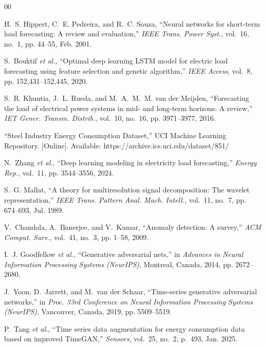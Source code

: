 \documentclass[conference]{IEEEtran}
\begin{document}
\begin{thebibliography}{00}

H.~S. Hippert, C.~E. Pedreira, and R.~C. Souza, ``Neural networks 
for short-term load forecasting: A review and evaluation,'' 
\emph{IEEE Trans. Power Syst.}, vol.~16, no.~1, pp. 44--55, 
Feb. 2001.

S.~Bouktif \emph{et al.}, ``Optimal deep learning LSTM model for 
electric load forecasting using feature selection and genetic 
algorithm,'' \emph{IEEE Access}, vol.~8, pp. 152,431--152,445, 2020.

S.~R. Khuntia, J.~L. Rueda, and M.~A.~M.~M. van der Meijden, 
``Forecasting the load of electrical power systems in mid- and 
long-term horizons: A review,'' \emph{IET Gener. Transm. Distrib.}, 
vol.~10, no.~16, pp. 3971--3977, 2016.

``Steel Industry Energy Consumption Dataset,'' UCI Machine 
Learning Repository. [Online]. Available: 
https://archive.ics.uci.edu/dataset/851/

N.~Zhang \emph{et al.}, ``Deep learning modeling in electricity 
load forecasting,'' \emph{Energy Rep.}, vol.~11, pp. 3544--3556, 
2024.

S.~G. Mallat, ``A theory for multiresolution signal decomposition: 
The wavelet representation,'' \emph{IEEE Trans. Pattern Anal. 
Mach. Intell.}, vol.~11, no.~7, pp. 674--693, Jul. 1989.

V.~Chandola, A.~Banerjee, and V.~Kumar, ``Anomaly detection: 
A survey,'' \emph{ACM Comput. Surv.}, vol.~41, no.~3, pp. 1--58, 
2009.

I.~J. Goodfellow \emph{et al.}, ``Generative adversarial nets,'' 
in \emph{Advances in Neural Information Processing Systems 
(NeurIPS)}, Montreal, Canada, 2014, pp. 2672--2680.

J.~Yoon, D.~Jarrett, and M.~van der Schaar, ``Time-series 
generative adversarial networks,'' in \emph{Proc. 33rd 
Conference on Neural Information Processing Systems (NeurIPS)}, 
Vancouver, Canada, 2019, pp. 5509--5519.

P.~Tang \emph{et al.}, ``Time series data augmentation for 
energy consumption data based on improved TimeGAN,'' 
\emph{Sensors}, vol.~25, no.~2, p.~493, Jan. 2025.

\end{thebibliography}
\end{document}
